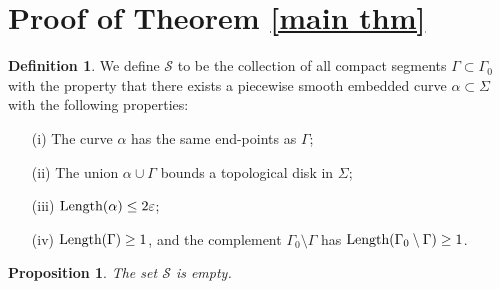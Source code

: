 \documentclass[a4paper, reqno]{amsart}
\newtheorem{proposition}[theorem]{Proposition}
\theoremstyle{definition}
\newtheorem{definition}{Definition}[section]
\theoremstyle{remark}
\numberwithin{equation}{section}
\newcommand{\Len}{\textup{Length}}
\numberwithin{equation}{section}
\numberwithin{equation}{section}
\begin{document}
\bigskip


\section{Proof of Theorem \ref{main thm}}



\begin{definition}
We define $\mathcal{S}$ to be the collection of all compact segments $\Gamma\subset\Gamma_0$ with the property that there exists a piecewise smooth embedded curve $\alpha\subset\Sigma$ with the following properties:	
\begin{itemize}
\item[(i)] The curve $\alpha$ has the same end-points as $\Gamma$;
\item[(ii)] The union $\alpha\cup\Gamma$ bounds a topological disk in $\Sigma$;
\item[(iii)] $\Len(\alpha)\leq 2\varepsilon$;
\item[(iv)] $\Len(\Gamma)\geq 1$, and the complement $\Gamma_0\setminus\Gamma$ has $\Len(	\Gamma_0\setminus\Gamma)\geq 1$.
\end{itemize}
\end{definition}

\bigskip

\begin{proposition}{\label{empty S}}
	The set $\mathcal{S}$ is empty.
\end{proposition}
\end{document}
